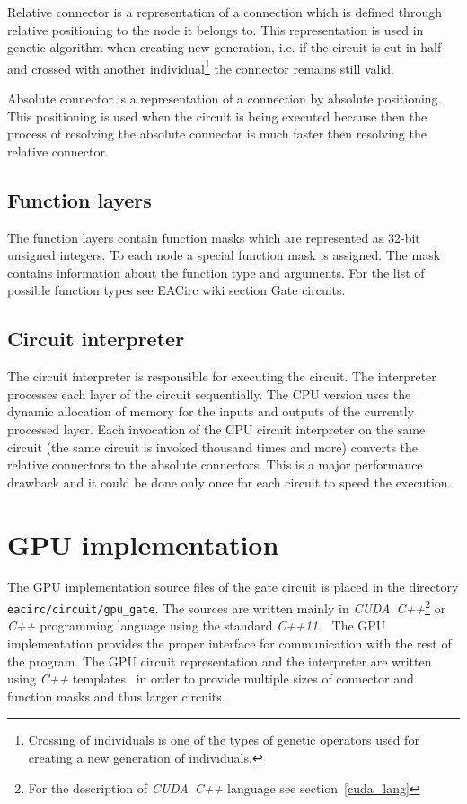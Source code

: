 \documentclass[12pt,oneside]{fithesis2}
\begin{document}
Relative connector is a representation of a connection which is defined through relative positioning to the node it belongs to. This representation is used in genetic algorithm when creating new generation, i.e. if the circuit is cut in half and crossed with another individual\footnote{Crossing of individuals is one of the types of genetic operators used for creating a new generation of individuals.} the connector remains still valid.

Absolute connector is a representation of a connection by absolute positioning. This positioning is used when the circuit is being executed because then the process of resolving the absolute connector is much faster then resolving the relative connector.

\subsection{Function layers}

The function layers contain function masks which are represented as 32-bit unsigned integers. To each node a special function mask is assigned. The mask contains information about the function type and arguments. For the list of possible function types see EACirc wiki section Gate circuits.~\cite{eacirc_circuit}

\subsection{Circuit interpreter}

The circuit interpreter is responsible for executing the circuit. The interpreter processes each layer of the circuit sequentially. The CPU version uses the dynamic allocation of memory for the inputs and outputs of the currently processed layer. Each invocation of the CPU circuit interpreter on the same circuit (the same circuit is invoked thousand times and more) converts the relative connectors to the absolute connectors. This is a major performance drawback and it could be done only once for each circuit to speed the execution.


\section{GPU implementation}

The GPU implementation source files of the gate circuit is placed in the directory \texttt{eacirc/circuit/gpu\_gate}. The sources are written mainly in \emph{CUDA~C++}\footnote{For the description of \emph{CUDA~C++} language see section~\ref{cuda_lang}} or \emph{C++} programming language using the standard \emph{C++11}.~\cite{std_c++11, cuda_guide} The GPU implementation provides the proper interface for communication with the rest of the program. The GPU circuit representation and the interpreter are written using \emph{C++} templates~\cite{std_c++11} in order to provide multiple sizes of connector and function masks and thus larger circuits.
\end{document}
